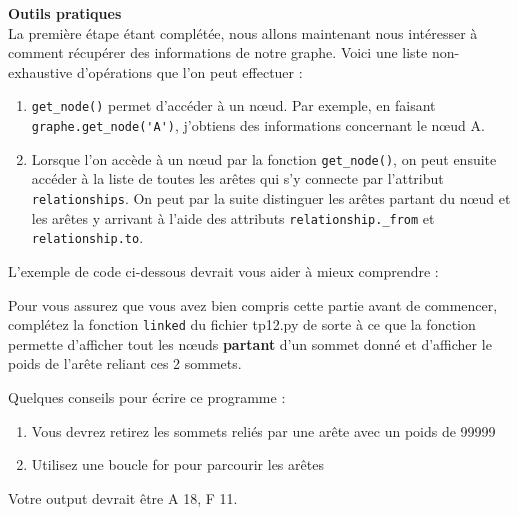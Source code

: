 \begin{Exercice}[10 minutes]\textbf{Outils pratiques}\\
    La première étape étant complétée, nous allons maintenant nous intéresser à comment récupérer des informations de notre graphe. Voici une liste non-exhaustive d'opérations que l'on peut effectuer :\\
    \begin{enumerate}
        \item \lstinline{get_node()} permet d'accéder à un nœud. Par exemple, en faisant \lstinline{graphe.get_node('A')}, j'obtiens des informations concernant le nœud A.
        \item Lorsque l'on accède à un nœud par la fonction \lstinline{get_node()}, on peut ensuite accéder à la liste de toutes les arêtes qui s'y connecte par l'attribut \lstinline{relationships}. On peut par la suite distinguer les arêtes partant du nœud et les arêtes y arrivant à l'aide des attributs \lstinline{relationship._from} et \lstinline{relationship.to}.
    \end{enumerate}
    
    L'exemple de code ci-dessous devrait vous aider à mieux comprendre :
    
    
    Pour vous assurez que vous avez bien compris cette partie avant de commencer, complétez la fonction \lstinline{linked} du fichier tp12.py de sorte à ce que la fonction permette d'afficher tout les nœuds \textbf{partant} d'un sommet donné et d'afficher le poids de l'arête reliant ces 2 sommets.\\
    
    
    \begin{conseil}
        Quelques conseils pour écrire ce programme :
        \begin{enumerate}
            \item Vous devrez retirez les sommets reliés par une arête avec un poids de 99999
            \item Utilisez une boucle for pour parcourir les arêtes
        \end{enumerate}
    Votre output devrait être A 18, F 11.
    \end{conseil}
    \begin{solution}
        
    \end{solution}
\end{Exercice}

